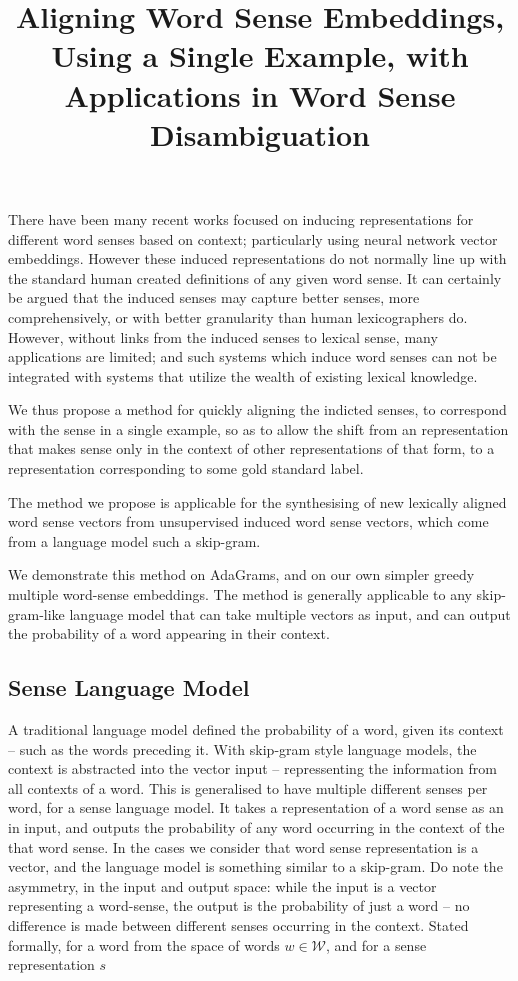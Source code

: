 \documentclass{sig-alternate}
\newcommand{\W}{\mathcal{W}}
\begin{document}
\title{Aligning Word Sense Embeddings, Using a Single Example, with Applications in Word Sense Disambiguation}
\maketitle


There have been many recent works focused on inducing representations for different word senses based on context; particularly using neural network vector embeddings.
However these induced representations do not normally line up with the standard human created definitions of any given word sense.
It can certainly be argued that the induced senses may capture better senses, more comprehensively, or with better granularity than human lexicographers do.
However, without links from the induced senses to lexical sense, many applications are limited; and such systems which induce word senses can not be integrated with systems that utilize the wealth of existing lexical knowledge.

We thus propose a method for quickly aligning the indicted senses, to correspond with the sense in a single example, so as to allow the shift from an representation that makes sense only in the context of other representations of that form, to a representation corresponding to some gold standard label.

The method we propose is applicable for the synthesising of new lexically aligned word sense vectors from unsupervised induced word sense vectors, which come from a language model such a skip-gram.



We demonstrate this method on AdaGrams\cite{AdaGrams}, and on our own simpler greedy multiple word-sense embeddings. The method is generally applicable to any skip-gram-like language model that can take multiple vectors as input, and can output the probability of a word appearing in their context.

\subsection{Sense Language Model}
A traditional language model defined the probability of a word, given its context -- such as the words preceding it.
With skip-gram style language models, the context is abstracted into the vector input -- repressenting the information from all contexts of a word. This is generalised to have multiple different senses per word, for a sense language model.
It takes a representation of a word sense as an in input, and outputs the probability of any word occurring in the context of the that word sense. In the cases we consider that word sense representation is a vector, and the language model is something similar to a skip-gram. Do note the asymmetry, in the input and output space: while the input is a vector representing a word-sense, the output is the probability of just a word -- no difference is made between different senses occurring in the context. Stated formally, for a word from the space of words $w\in \W$, and for a sense representation $s$
\end{document}
